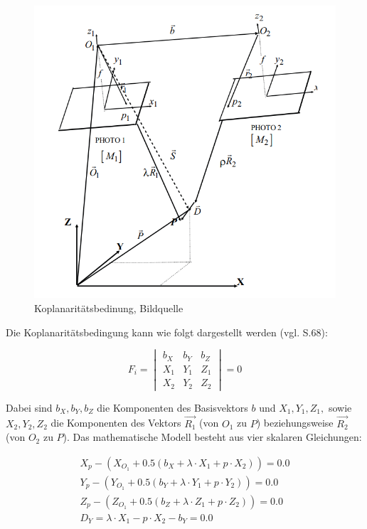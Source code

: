 \begin{figure}[H]
	\centering
	\includegraphics[scale=0.6]{coplanarity.png}
	\caption{Koplanaritätsbedinung, Bildquelle \cite{comparative_conditions_study}}
\end{figure} 

Die Koplanaritätsbedingung kann wie folgt dargestellt werden (vgl. \cite{comparative_conditions_study} S.68):

\begin{equation}
F_i = \begin{vmatrix}
b_X & b_Y & b_Z \\
X_1 & Y_1 & Z_1 \\
X_2 & Y_2 & Z_2
\end{vmatrix}
=0
\end{equation}

Dabei sind $b_X,b_Y,b_Z$ die Komponenten des Basisvektors $b$ und $X_1,Y_1,Z_1,$ sowie $X_2,Y_2,Z_2$ die Komponenten des Vektors $\vec{R_1}$ (von $O_1$ zu $P$) beziehungsweise  $\vec{R_2}$ (von $O_2$ zu $P$). Das mathematische Modell besteht aus vier skalaren Gleichungen:

\begin{equation}
\begin{aligned}
X_p - (X_{O_1}+0.5(b_X+ \lambda \cdot X_1 + p \cdot X_2)) = 0.0 \\
Y_p - (Y_{O_1}+0.5(b_Y+ \lambda \cdot Y_1 + p \cdot Y_2)) = 0.0 \\
Z_p - (Z_{O_1}+0.5(b_Z+ \lambda \cdot Z_1 + p \cdot Z_2)) = 0.0 \\
D_Y = \lambda\cdot X_1-p\cdot X_2-b_Y = 0.0
\end{aligned}
\end{equation}

